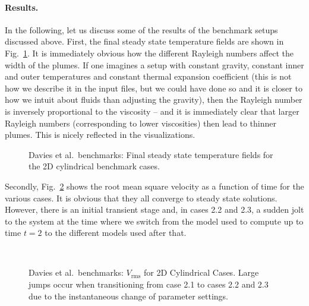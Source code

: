 \documentclass{article}
\begin{document}
\paragraph{Results.}

In the following, let us discuss some of the results of the benchmark setups
discussed above. First, the final steady state temperature fields are shown in
Fig.~\ref{fig:davies-2DcylinderFSS}. It is immediately obvious how the
different Rayleigh numbers affect the width of the plumes. If one imagines a
setup with constant gravity, constant inner and outer temperatures and
constant thermal expansion coefficient (this is not how we describe it in the
input files, but we could have done so and it is closer to how we intuit about
fluids than adjusting the gravity), then the Rayleigh number is inversely
proportional to the viscosity -- and it is immediately clear that larger
Rayleigh numbers (corresponding to lower viscosities) then lead to thinner
plumes. This is nicely reflected in the visualizations.

\begin{figure}[h]
  \hfill
  \hfill
  \hfill
  \hfill
  \caption{Davies et al.~benchmarks: Final steady state temperature fields for
    the 2D cylindrical benchmark cases.}
  \label{fig:davies-2DcylinderFSS}
\end{figure}

Secondly, Fig.~\ref{fig:davies-2DcylinderVrms} shows the root mean square
velocity as a function of time for the various cases. It is obvious that they
all converge to steady state solutions. However, there is an initial transient
stage and, in cases 2.2 and 2.3, a sudden jolt to the system at the time where
we switch from the model used to compute up to time $t=2$ to the
different models used after that.

\begin{figure}[h]
  \hfill
  \\
  \hfill
  \hfill
  \caption{Davies et al.~benchmarks: $V_{\text{rms}}$ for 2D Cylindrical Cases. Large jumps occur when transitioning from case 2.1 to cases 2.2 and 2.3 due to the instantaneous change of parameter settings.}
  \label{fig:davies-2DcylinderVrms}
\end{figure}
\end{document}
